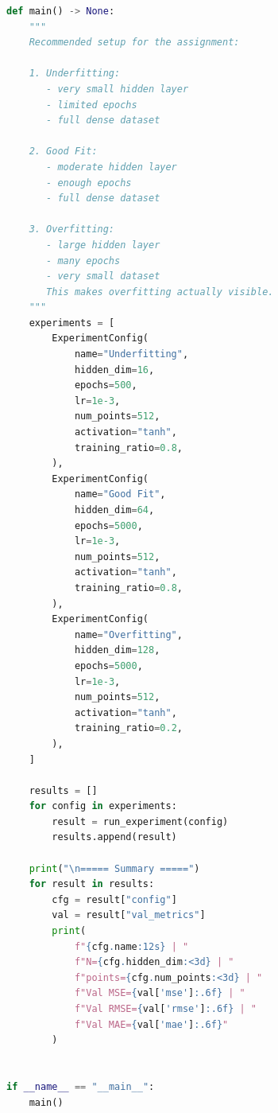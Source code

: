 \documentclass[11pt]{article}
\begin{document}
\begin{lstlisting}[language=Python]
def main() -> None:
    """
    Recommended setup for the assignment:

    1. Underfitting:
       - very small hidden layer
       - limited epochs
       - full dense dataset

    2. Good Fit:
       - moderate hidden layer
       - enough epochs
       - full dense dataset

    3. Overfitting:
       - large hidden layer
       - many epochs
       - very small dataset
       This makes overfitting actually visible.
    """
    experiments = [
        ExperimentConfig(
            name="Underfitting",
            hidden_dim=16,
            epochs=500,
            lr=1e-3,
            num_points=512,
            activation="tanh",
            training_ratio=0.8,
        ),
        ExperimentConfig(
            name="Good Fit",
            hidden_dim=64,
            epochs=5000,
            lr=1e-3,
            num_points=512,
            activation="tanh",
            training_ratio=0.8,
        ),
        ExperimentConfig(
            name="Overfitting",
            hidden_dim=128,
            epochs=5000,
            lr=1e-3,
            num_points=512,
            activation="tanh",
            training_ratio=0.2,
        ),
    ]

    results = []
    for config in experiments:
        result = run_experiment(config)
        results.append(result)

    print("\n===== Summary =====")
    for result in results:
        cfg = result["config"]
        val = result["val_metrics"]
        print(
            f"{cfg.name:12s} | "
            f"N={cfg.hidden_dim:<3d} | "
            f"points={cfg.num_points:<3d} | "
            f"Val MSE={val['mse']:.6f} | "
            f"Val RMSE={val['rmse']:.6f} | "
            f"Val MAE={val['mae']:.6f}"
        )


if __name__ == "__main__":
    main()

\end{lstlisting}
\end{document}
